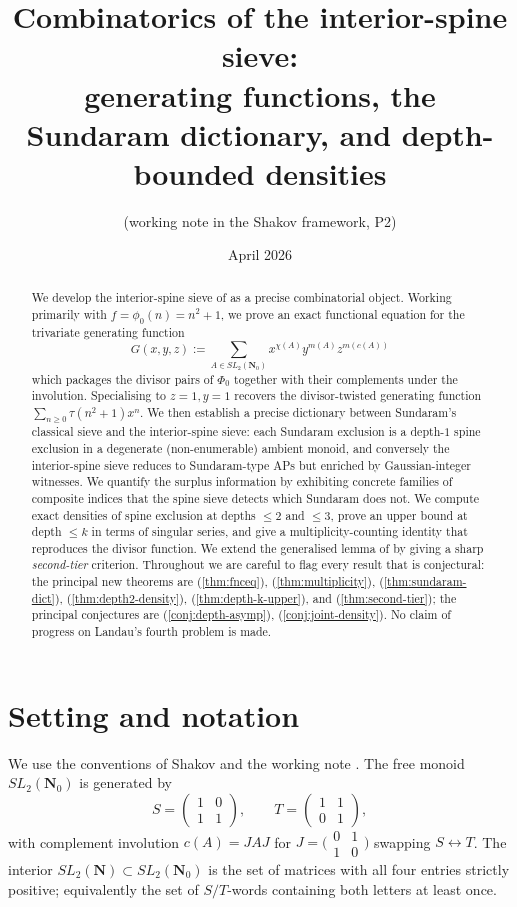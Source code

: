 \documentclass[11pt]{article}
\title{Combinatorics of the interior-spine sieve: \\ generating functions, the Sundaram dictionary, and depth-bounded densities}
\author{(working note in the Shakov framework, P2)}
\date{April 2026}
\theoremstyle{definition}
\newcommand{\N}{\mathbf{N}}
\newcommand{\Nz}{\mathbf{N}_0}
\newcommand{\SLNz}{SL_2(\Nz)}
\newcommand{\SLN}{SL_2(\N)}
\newcommand{\Phzero}{\Phi_0}
\begin{document}
\maketitle

\begin{abstract}
We develop the interior-spine sieve of \cite{B8} as a precise combinatorial object. Working primarily with $f = \phi_0(n) = n^2+1$, we prove an exact functional equation for the trivariate generating function
\[
G(x,y,z) := \sum_{A \in \SLNz} x^{\chi(A)} y^{m(A)} z^{m(c(A))}
\]
which packages the divisor pairs of $\Phzero$ together with their complements under the involution. Specialising to $z=1, y=1$ recovers the divisor-twisted generating function $\sum_{n\ge 0} \tau(n^2+1) x^n$. We then establish a precise dictionary between Sundaram's classical sieve and the interior-spine sieve: each Sundaram exclusion is a depth-$1$ spine exclusion in a degenerate (non-enumerable) ambient monoid, and conversely the interior-spine sieve reduces to Sundaram-type APs but enriched by Gaussian-integer witnesses. We quantify the surplus information by exhibiting concrete families of composite indices that the spine sieve detects which Sundaram does not. We compute exact densities of spine exclusion at depths $\le 2$ and $\le 3$, prove an upper bound at depth $\le k$ in terms of singular series, and give a multiplicity-counting identity that reproduces the divisor function. We extend the generalised lemma of \cite{B8} by giving a sharp \emph{second-tier} criterion. Throughout we are careful to flag every result that is conjectural: the principal new theorems are (\ref{thm:fnceq}), (\ref{thm:multiplicity}), (\ref{thm:sundaram-dict}), (\ref{thm:depth2-density}), (\ref{thm:depth-k-upper}), and (\ref{thm:second-tier}); the principal conjectures are (\ref{conj:depth-asymp}), (\ref{conj:joint-density}). No claim of progress on Landau's fourth problem is made.
\end{abstract}

\tableofcontents

\section{Setting and notation}

We use the conventions of Shakov \cite{shakov} and the working note \cite{B8}. The free monoid $\SLNz$ is generated by
\[
S = \begin{pmatrix}1 & 0 \\ 1 & 1\end{pmatrix}, \qquad T = \begin{pmatrix}1 & 1 \\ 0 & 1\end{pmatrix},
\]
with complement involution $c(A) = JAJ$ for $J = \bigl(\begin{smallmatrix}0 & 1 \\ 1 & 0\end{smallmatrix}\bigr)$ swapping $S \leftrightarrow T$. The interior $\SLN \subset \SLNz$ is the set of matrices with all four entries strictly positive; equivalently the set of $S/T$-words containing both letters at least once.
\end{document}
